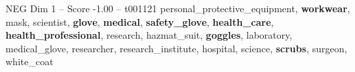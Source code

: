 \begin{textsample}{NEG Dim 1 – Score -1.00 – t001121}  \label{ex:f1_neg_038}
personal\_protective\_equipment, \textbf{workwear}, mask, scientist, \textbf{glove}, \textbf{medical}, \textbf{safety\_glove}, \textbf{health\_care}, \textbf{health\_professional}, research, hazmat\_suit, \textbf{goggles}, laboratory, medical\_glove, researcher, research\_institute, hospital, science, \textbf{scrubs}, surgeon, white\_coat

\end{textsample}
